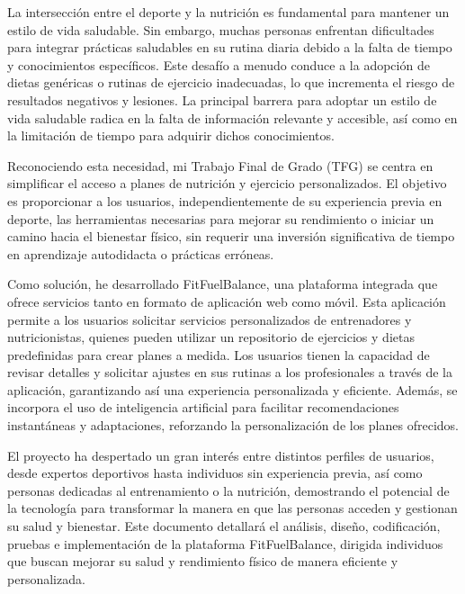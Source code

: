 La intersección entre el deporte y la nutrición es fundamental para mantener un estilo de vida saludable. Sin embargo, muchas personas enfrentan dificultades para integrar prácticas saludables en su rutina diaria debido a la falta de tiempo y conocimientos específicos. Este desafío a menudo conduce a la adopción de dietas genéricas o rutinas de ejercicio inadecuadas, lo que incrementa el riesgo de resultados negativos y lesiones. La principal barrera para adoptar un estilo de vida saludable radica en la falta de información relevante y accesible, así como en la limitación de tiempo para adquirir dichos conocimientos.

Reconociendo esta necesidad, mi Trabajo Final de Grado (TFG) se centra en simplificar el acceso a planes de nutrición y ejercicio personalizados. El objetivo es proporcionar a los usuarios, independientemente de su experiencia previa en deporte, las herramientas necesarias para mejorar su rendimiento o iniciar un camino hacia el bienestar físico, sin requerir una inversión significativa de tiempo en aprendizaje autodidacta o prácticas erróneas.

Como solución, he desarrollado FitFuelBalance, una plataforma integrada que ofrece servicios tanto en formato de aplicación web como móvil. Esta aplicación permite a los usuarios solicitar servicios personalizados de entrenadores y nutricionistas, quienes pueden utilizar un repositorio de ejercicios y dietas predefinidas para crear planes a medida. Los usuarios tienen la capacidad de revisar detalles y solicitar ajustes en sus rutinas a los profesionales a través de la aplicación, garantizando así una experiencia personalizada y eficiente. Además, se incorpora el uso de inteligencia artificial para facilitar recomendaciones instantáneas y adaptaciones, reforzando la personalización de los planes ofrecidos.

El proyecto ha despertado un gran interés entre distintos perfiles de usuarios, desde expertos deportivos hasta individuos sin experiencia previa, así como personas dedicadas al entrenamiento o la nutrición, demostrando el potencial de la tecnología para transformar la manera en que las personas acceden y gestionan su salud y bienestar.
Este documento detallará el análisis, diseño, codificación, pruebas e implementación de la plataforma FitFuelBalance, dirigida individuos que buscan mejorar su salud y rendimiento físico de manera eficiente y personalizada.


